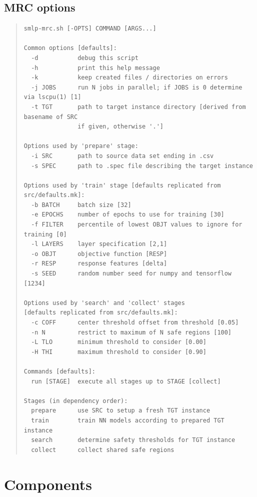 \documentclass[a4paper,parskip=half]{article} %
\newenvironment{cmdhelp}{\begin{quote}\footnotesize}{\end{quote}}
\begin{document}
\subsection{MRC options}
\begin{cmdhelp}\begin{verbatim}
smlp-mrc.sh [-OPTS] COMMAND [ARGS...]

Common options [defaults]:
  -d           debug this script
  -h           print this help message
  -k           keep created files / directories on errors
  -j JOBS      run N jobs in parallel; if JOBS is 0 determine via lscpu(1) [1]
  -t TGT       path to target instance directory [derived from basename of SRC
               if given, otherwise '.']

Options used by 'prepare' stage:
  -i SRC       path to source data set ending in .csv
  -s SPEC      path to .spec file describing the target instance

Options used by 'train' stage [defaults replicated from src/defaults.mk]:
  -b BATCH     batch size [32]
  -e EPOCHS    number of epochs to use for training [30]
  -f FILTER    percentile of lowest OBJT values to ignore for training [0]
  -l LAYERS    layer specification [2,1]
  -o OBJT      objective function [RESP]
  -r RESP      response features [delta]
  -s SEED      random number seed for numpy and tensorflow [1234]

Options used by 'search' and 'collect' stages
[defaults replicated from src/defaults.mk]:
  -c COFF      center threshold offset from threshold [0.05]
  -n N         restrict to maximum of N safe regions [100]
  -L TLO       minimum threshold to consider [0.00]
  -H THI       maximum threshold to consider [0.90]

Commands [defaults]:
  run [STAGE]  execute all stages up to STAGE [collect]

Stages (in dependency order):
  prepare      use SRC to setup a fresh TGT instance
  train        train NN models according to prepared TGT instance
  search       determine safety thresholds for TGT instance
  collect      collect shared safe regions
\end{verbatim}\end{cmdhelp}





\section{Components}
\end{document}
